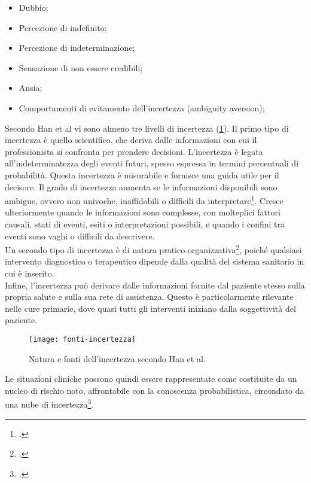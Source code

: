 \begin{itemize}
    \item Dubbio;
    \item Percezione di indefinito;
    \item Percezione di indeterminazione;
    \item Sensazione di non essere credibili;
    \item Ansia;
    \item Comportamenti di evitamento dell'incertezza (ambiguity aversion);
\end{itemize}

\noindent Secondo Han et al vi sono almeno tre livelli di incertezza (\ref{fig:fonti-incertezza}). Il primo tipo di incertezza è quello scientifico, che deriva dalle informazioni con cui il professionista si confronta per prendere decisioni. L'incertezza è legata all'indeterminatezza degli eventi futuri, spesso espressa in termini percentuali di probabilità. Questa incertezza è misurabile e fornisce una guida utile per il decisore. Il grado di incertezza aumenta se le informazioni disponibili sono ambigue, ovvero non univoche, inaffidabili o difficili da interpretare\footcite{womak:recenti-progressi-medicina}. Cresce ulteriormente quando le informazioni sono complesse, con molteplici fattori causali, stati di eventi, esiti o interpretazioni possibili, e quando i confini tra eventi sono vaghi o difficili da descrivere.\\
Un secondo tipo di incertezza è di natura pratico-organizzativa\footcite{womak:recenti-progressi-medicina}, poiché qualsiasi intervento diagnostico o terapeutico dipende dalla qualità del sistema sanitario in cui è inserito.\\ 
Infine, l'incertezza può derivare dalle informazioni fornite dal paziente stesso sulla propria salute e sulla sua rete di assistenza. Questo è particolarmente rilevante nelle cure primarie, dove quasi tutti gli interventi iniziano dalla soggettività del paziente.\\

\begin{figure}[!ht] 
    \centering 
    \texttt{[image: fonti-incertezza]} 
    \caption{Natura e fonti dell'incertezza secondo Han et al.}
    \label{fig:fonti-incertezza}
\end{figure}

Le situazioni cliniche possono quindi essere rappresentate come costituite da un nucleo di rischio noto, affrontabile con la conoscenza probabilistica, circondato da una nube di incertezza\footcite{womak:clinica-relazione-decisione}.\\

